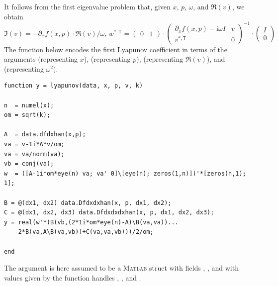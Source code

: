 It follows from the first eigenvalue problem that, given $x$, $p$, $\omega$, and $\Re(v)$, we obtain
\[
\Im(v)=-\partial_xf(x,p)\cdot \Re(v)/\omega,\,
w^{\ast,\mathsf{T}}=\begin{pmatrix}0 & 1\end{pmatrix}\cdot\begin{pmatrix}\partial_xf(x,p)-\mathrm{i}\omega I & v\\v^{\ast,\mathsf{T}} & 0\end{pmatrix}^{-1}\cdot\begin{pmatrix}I\\0\end{pmatrix}
\]
The function  below encodes the first Lyapunov coefficient in terms of the arguments  (representing $x$),  (representing $p$),  (representing $\Re(v)$), and  (representing $\omega^2)$.
\begin{lstlisting}[language=coco-highlight,frame=shadowbox]
function y = lyapunov(data, x, p, v, k)

n  = numel(x);
om = sqrt(k);

A  = data.dfdxhan(x,p);
va = v-1i*A*v/om;
va = va/norm(va);
vb = conj(va);
w  = ([A-1i*om*eye(n) va; va' 0]\[eye(n); zeros(1,n)])'*[zeros(n,1); 1];

B = @(dx1, dx2) data.Dfdxdxhan(x, p, dx1, dx2);
C = @(dx1, dx2, dx3) data.Dfdxdxdxhan(x, p, dx1, dx2, dx3);
y = real(w'*(B(vb,(2*1i*om*eye(n)-A)\B(va,va))...
   -2*B(va,A\B(va,vb))+C(va,va,vb)))/2/om;

end
\end{lstlisting}
The  argument is here assumed to be a \textsc{Matlab} struct with fields , , and  with values given by the function handles , , and . 

